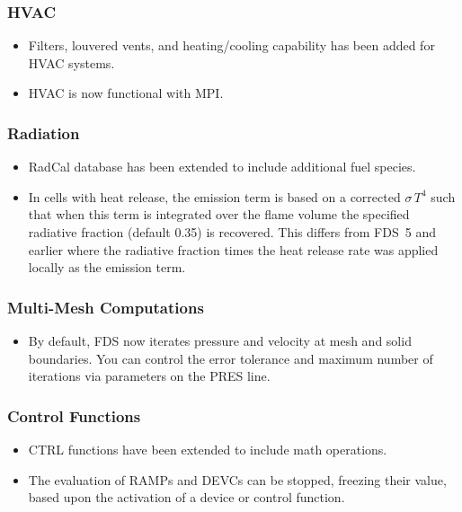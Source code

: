 \documentclass[11pt]{book}
\begin{document}
\subsubsection{HVAC}

   \begin{itemize}
    \item Filters, louvered vents, and heating/cooling capability has been added for HVAC systems.
    \item HVAC is now functional with MPI.
    \end{itemize}

\subsubsection{Radiation}

    \begin{itemize}
    \item RadCal database has been extended to include additional fuel species.
    \item In cells with heat release, the emission term is based on a corrected $\sigma \, T^4$ such that when this term is integrated over the flame volume the specified radiative fraction (default 0.35) is recovered. This differs from FDS~5 and earlier where the radiative fraction times the heat release rate was applied locally as the emission term.
    \end{itemize}

\subsubsection{Multi-Mesh Computations}

    \begin{itemize}
    \item By default, FDS now iterates pressure and velocity at mesh and solid boundaries. You can control the error tolerance and maximum number of iterations via parameters on the {\ct PRES} line.
    \end{itemize}

\subsubsection{Control Functions}

    \begin{itemize}
    \item {\ct CTRL} functions have been extended to include math operations.
    \item The evaluation of {\ct RAMP}s and {\ct DEVC}s can be stopped, freezing their value, based upon the activation of a device or control function.
    \end{itemize}
\end{document}
